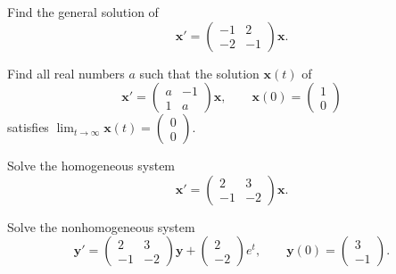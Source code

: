 \documentclass[11pt,oneside]{article}
\begin{document}
\begin{problem}
Find the general solution of
\[
\mathbf x'=\begin{pmatrix}-1&2\\-2&-1\end{pmatrix}\mathbf x.
\]
\end{problem}

\begin{problem}
Find all real numbers $a$ such that the solution $\mathbf x(t)$ of
\[
\mathbf x'=\begin{pmatrix}a&-1\\1&a\end{pmatrix}\mathbf x,\qquad
\mathbf x(0)=\begin{pmatrix}1\\0\end{pmatrix}
\]
satisfies $\displaystyle\lim_{t\to\infty}\mathbf x(t)=\begin{pmatrix}0\\0\end{pmatrix}$.
\end{problem}

\begin{problem}
\begin{problemsubparts}
\item Solve the homogeneous system
\[
\mathbf x'=\begin{pmatrix}2&3\\-1&-2\end{pmatrix}\mathbf x.
\]
\item Solve the nonhomogeneous system
\[
\mathbf y'=\begin{pmatrix}2&3\\-1&-2\end{pmatrix}\mathbf y
+\begin{pmatrix}2\\-2\end{pmatrix}e^t,\qquad
\mathbf y(0)=\begin{pmatrix}3\\-1\end{pmatrix}.
\]
\end{problemsubparts}
\end{problem}
\end{document}
